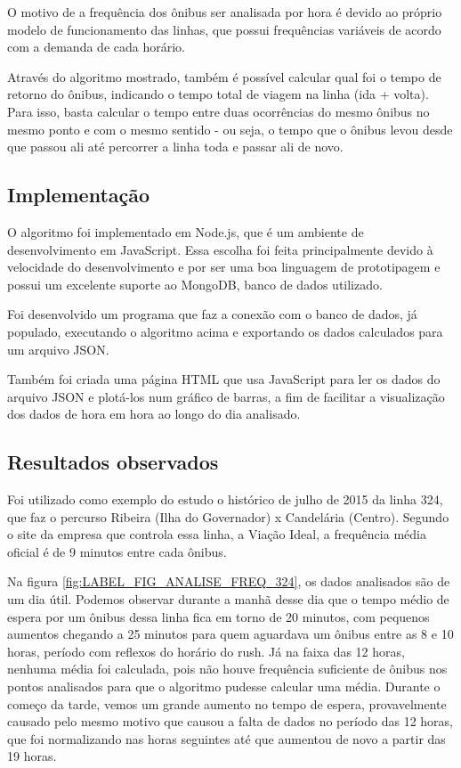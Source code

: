 O motivo de a frequência dos ônibus ser analisada por hora é devido ao próprio modelo de funcionamento das linhas, que possui frequências variáveis de acordo com a demanda de cada horário.

Através do algoritmo mostrado, também é possível calcular qual foi o tempo de retorno do ônibus, indicando o tempo total de viagem na linha (ida + volta). Para isso, basta calcular o tempo entre duas ocorrências do mesmo ônibus no mesmo ponto e com o mesmo sentido - ou seja, o tempo que o ônibus levou desde que passou ali até percorrer a linha toda e passar ali de novo.


\subsection{Implementação}

O algoritmo foi implementado em Node.js, que é um ambiente de desenvolvimento em JavaScript\cite{REF_JAVASCRIPT}\cite{REF_NODEJS}. Essa escolha foi feita principalmente devido à velocidade do desenvolvimento e por ser uma boa linguagem de prototipagem\cite{REF_NODEJS_PROTOTYPING} e possui um excelente suporte ao MongoDB, banco de dados utilizado.

Foi desenvolvido um programa que faz a conexão com o banco de dados, já populado, executando o algoritmo acima e exportando os dados calculados para um arquivo JSON. 

Também foi criada uma página HTML\cite{REF_HTML} que usa JavaScript para ler os dados do arquivo JSON e plotá-los num gráfico de barras, a fim de facilitar a visualização dos dados de hora em hora ao longo do dia analisado.


\subsection{Resultados observados}

Foi utilizado como exemplo do estudo o histórico de julho de 2015 da linha 324, que faz o percurso Ribeira (Ilha do Governador) x Candelária (Centro). Segundo o site da empresa que controla essa linha, a Viação Ideal, a frequência média oficial é de 9 minutos entre cada ônibus\cite{ideal_324}.

Na figura \ref{fig:LABEL_FIG_ANALISE_FREQ_324}, os dados analisados são de um dia útil. Podemos observar durante a manhã desse dia que o tempo médio de espera por um ônibus dessa linha fica em torno de 20 minutos, com pequenos aumentos chegando a 25 minutos para quem aguardava um ônibus entre as 8 e 10 horas, período com reflexos do horário do rush. Já na faixa das 12 horas, nenhuma média foi calculada, pois não houve frequência suficiente de ônibus nos pontos analisados para que o algoritmo pudesse calcular uma média. Durante o começo da tarde, vemos um grande aumento no tempo de espera, provavelmente causado pelo mesmo motivo que causou a falta de dados no período das 12 horas, que foi normalizando nas horas seguintes até que aumentou de novo a partir das 19 horas.


